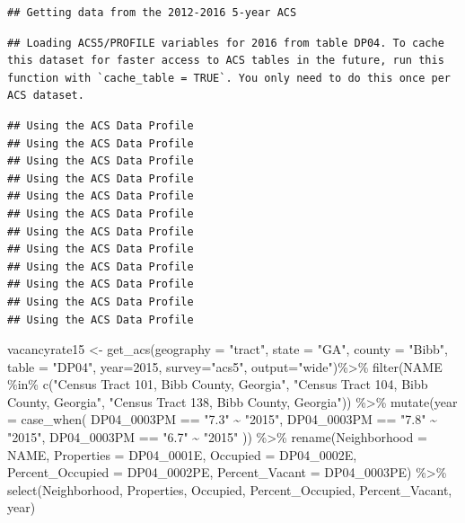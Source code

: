 \documentclass[
]{article}
\newenvironment{Shaded}{\begin{snugshade}}{\end{snugshade}}
\newcommand{\AttributeTok}[1]{\textcolor[rgb]{0.77,0.63,0.00}{#1}}
\newcommand{\DecValTok}[1]{\textcolor[rgb]{0.00,0.00,0.81}{#1}}
\newcommand{\FunctionTok}[1]{\textcolor[rgb]{0.00,0.00,0.00}{#1}}
\newcommand{\NormalTok}[1]{#1}
\newcommand{\OtherTok}[1]{\textcolor[rgb]{0.56,0.35,0.01}{#1}}
\newcommand{\SpecialCharTok}[1]{\textcolor[rgb]{0.00,0.00,0.00}{#1}}
\newcommand{\StringTok}[1]{\textcolor[rgb]{0.31,0.60,0.02}{#1}}
\begin{document}
\begin{verbatim}
## Getting data from the 2012-2016 5-year ACS
\end{verbatim}

\begin{verbatim}
## Loading ACS5/PROFILE variables for 2016 from table DP04. To cache this dataset for faster access to ACS tables in the future, run this function with `cache_table = TRUE`. You only need to do this once per ACS dataset.
\end{verbatim}

\begin{verbatim}
## Using the ACS Data Profile
## Using the ACS Data Profile
## Using the ACS Data Profile
## Using the ACS Data Profile
## Using the ACS Data Profile
## Using the ACS Data Profile
## Using the ACS Data Profile
## Using the ACS Data Profile
## Using the ACS Data Profile
## Using the ACS Data Profile
## Using the ACS Data Profile
## Using the ACS Data Profile
\end{verbatim}

\begin{Shaded}
\begin{Highlighting}[]
\NormalTok{vacancyrate15 }\OtherTok{\textless{}{-}} \FunctionTok{get\_acs}\NormalTok{(}\AttributeTok{geography =} \StringTok{"tract"}\NormalTok{, }\AttributeTok{state =} \StringTok{"GA"}\NormalTok{, }\AttributeTok{county =} \StringTok{"Bibb"}\NormalTok{, }\AttributeTok{table =} \StringTok{"DP04"}\NormalTok{,  }\AttributeTok{year=}\DecValTok{2015}\NormalTok{, }\AttributeTok{survey=}\StringTok{"acs5"}\NormalTok{, }\AttributeTok{output=}\StringTok{"wide"}\NormalTok{)}\SpecialCharTok{\%\textgreater{}\%}
\FunctionTok{filter}\NormalTok{(NAME }\SpecialCharTok{\%in\%} \FunctionTok{c}\NormalTok{(}\StringTok{"Census Tract 101, Bibb County, Georgia"}\NormalTok{, }\StringTok{"Census Tract 104, Bibb County, Georgia"}\NormalTok{, }\StringTok{"Census Tract 138, Bibb County, Georgia"}\NormalTok{)) }\SpecialCharTok{\%\textgreater{}\%}
  \FunctionTok{mutate}\NormalTok{(}\AttributeTok{year =} \FunctionTok{case\_when}\NormalTok{(}
\NormalTok{    DP04\_0003PM }\SpecialCharTok{==} \StringTok{"7.3"} \SpecialCharTok{\textasciitilde{}} \StringTok{"2015"}\NormalTok{,}
\NormalTok{    DP04\_0003PM }\SpecialCharTok{==} \StringTok{"7.8"} \SpecialCharTok{\textasciitilde{}} \StringTok{"2015"}\NormalTok{,}
\NormalTok{    DP04\_0003PM }\SpecialCharTok{==} \StringTok{"6.7"} \SpecialCharTok{\textasciitilde{}} \StringTok{"2015"}
\NormalTok{  )) }\SpecialCharTok{\%\textgreater{}\%}
  \FunctionTok{rename}\NormalTok{(}\AttributeTok{Neighborhood =}\NormalTok{ NAME,}
         \AttributeTok{Properties =}\NormalTok{ DP04\_0001E,}
         \AttributeTok{Occupied =}\NormalTok{ DP04\_0002E,}
         \AttributeTok{Percent\_Occupied =}\NormalTok{ DP04\_0002PE,}
         \AttributeTok{Percent\_Vacant =}\NormalTok{ DP04\_0003PE) }\SpecialCharTok{\%\textgreater{}\%}
   \FunctionTok{select}\NormalTok{(Neighborhood, Properties, Occupied, Percent\_Occupied, Percent\_Vacant, year) }
\end{Highlighting}
\end{Shaded}
\end{document}
